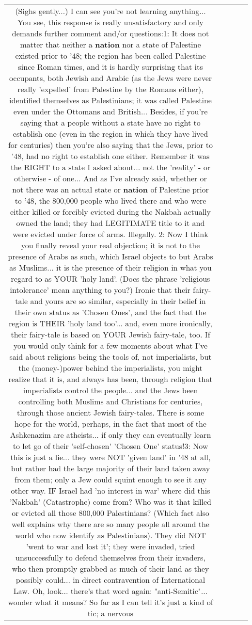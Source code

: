 \documentclass[11pt]{article}
\newlength\mylength
\begin{document}
\begin{center}
\begin{longtable}{|C{.65\mylength}|C{.30\mylength}|C{.12\mylength}|C{.12\mylength}|C{.12\mylength}|}
  \small (Sighs gently...) I can see you're not learning anything... You see, this response is really unsatisfactory and only demands further comment and/or questions:1: It does not matter that neither a \textbf{nation} nor a state of Palestine existed prior to '48; the region has been called Palestine since Roman times, and it is hardly surprising that its occupants, both Jewish and Arabic (as the Jews were never really 'expelled' from Palestine by the Romans either), identified themselves as Palestinians; it was called Palestine even under the Ottomans and British... Besides, if you're saying that a people without a state have no right to establish one (even in the region in which they have lived for centuries) then you're also saying that the Jews, prior to '48, had no right to establish one either. Remember it was the RIGHT to a state I asked about... not the 'reality' - or otherwise - of one... And as I've already said, whether or not there was an actual state or \textbf{nation} of Palestine prior to '48, the 800,000 people who lived there and who were either killed or forcibly evicted during the Nakbah actually owned the land; they had LEGITIMATE title to it and were evicted under force of arms. Illegally. 2: Now I think you finally reveal your real objection; it is not to the presence of Arabs as such, which Israel objects to but Arabs as Muslims... it is the presence of their religion in what you regard to as YOUR 'holy land'. (Does the phrase 'religious intolerance' mean anything to you?) Ironic that their fairy-tale and yours are so similar, especially in their belief in their own status as 'Chosen Ones', and the fact that the region is THEIR 'holy land too'... and, even more ironically, their fairy-tale is based on YOUR Jewish fairy-tale, too. If you would only think for a few moments about what I've said about religions being the tools of, not imperialists, but the (money-)power behind the imperialists, you might realize that it is, and always has been, through religion that imperialists control the people... and the Jews been controlling both Muslims and Christians for centuries, through those ancient Jewish fairy-tales. There is some hope for the world, perhaps, in the fact that most of the Ashkenazim are atheists... if only they can eventually learn to let go of their 'self-chosen' 'Chosen One' status!3: Now this is just a lie... they were NOT 'given land' in '48 at all, but rather had the large majority of their land taken away from them; only a Jew could squint enough to see it any other way. IF Israel had 'no interest in war' where did this 'Nakbah' (Catastrophe) come from? Who was it that killed or evicted all those 800,000 Palestinians? (Which fact also well explains why there are so many people all around the world who now identify as Palestinians). They did NOT 'went to war and lost it'; they were invaded, tried unsuccessfully to defend themselves from their invaders, who then promptly grabbed as much of their land as they possibly could... in direct contravention of International Law. Oh, look... there's that word again: "anti-Semitic"... wonder what it means? So far as I can tell it's just a kind of tic; a nervous 
\end{longtable}
\end{center}
\end{document}
